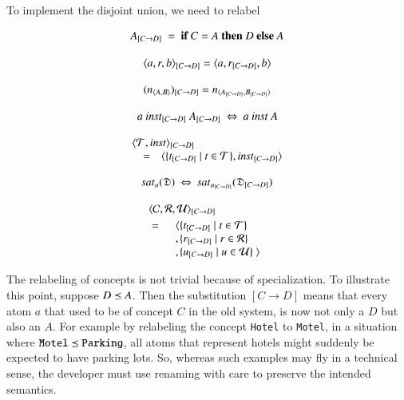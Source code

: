 \documentclass{elsarticle}
\begin{document}
To implement the disjoint union, we need to relabel 
\begin{definition}
   \[\subst{C}{D}{A}\ =\ \text{\bf if}\ C=A\ \text{\bf then}\ D\ \text{\bf else}\ A\]
\end{definition}
\begin{definition}
   \[\subst{C}{D}{\triple{a}{r}{b}} = \triple{a}{\subst{C}{D}{r}}{b}\]
\end{definition}
\begin{definition}
   \[\subst{C}{D}{(\declare{n}{A}{B})} = \declare{n}{\subst{C}{D}{A}}{\subst{C}{D}{B}}\]
\end{definition}
\begin{definition}
   \[a\ \subst{C}{D}{\inst}\ \subst{C}{D}{A}\ \Leftrightarrow\ a\ \inst\ A\]
\end{definition}
\begin{definition}
   \[\begin{array}{rcl}
      \rlap{$\subst{C}{D}{\pair{\triples}{\inst}}$}\\
      &=&\pair{\{\subst{C}{D}{t}\mid t\in\triples\}}{\subst{C}{D}{\inst}}
   \end{array}\]
\end{definition}
\begin{definition}
   \[\sat{u}{\dataset}\ \Leftrightarrow\ \sat{\subst{C}{D}{u}}{\subst{C}{D}{\dataset}}\]
\end{definition}
\begin{definition}
   \begin{eqnarray}
      \rlap{$\subst{C}{D}{\triple{\concepts}{\rels}{\rules}}$}\notag\\
      &=&\begin{array}[t]{l@{}l}
         \la&\{\subst{C}{D}{t}\mid t\in\triples\}\\
         ,&\{\subst{C}{D}{r}\mid r\in\rels\}\\
         ,&\{\subst{C}{D}{u}\mid u\in\rules\}\ \ra\notag
         \end{array}
   \end{eqnarray}
\end{definition}
   
   The relabeling of concepts is not trivial because of specialization.
   To illustrate this point, suppose $D\isa A$.
   Then the substitution $[C\rightarrow D]$ means that every atom $a$ that used to be of concept $C$ in the old system, is now not only a $D$ but also an $A$.
   For example by relabeling the concept {\tt Hotel} to {\tt Motel}, in a situation where ${\tt Motel}\isa{\tt Parking}$,
   all atoms that represent hotels might suddenly be expected to have parking lots.
   So, whereas such examples may fly in a technical sense, the developer must use renaming with care to preserve the intended semantics.
\end{document}
